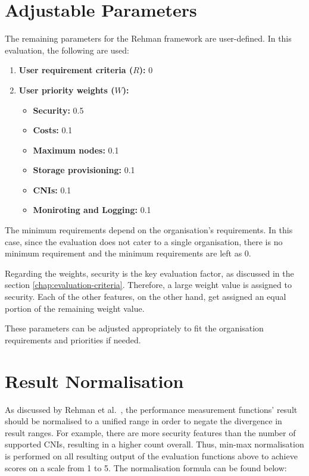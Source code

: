 \section{Adjustable Parameters}\label{adjustable-parameters}

The remaining parameters for the Rehman framework are user-defined. In this evaluation, the following are used:

\begin{enumerate}
\def\labelenumi{\arabic{enumi}.}
\tightlist
\item
  \textbf{User requirement criteria (\(R\)):} 0
\item
  \textbf{User priority weights (\(W\)):}

  \begin{itemize}
  \tightlist
  \item
    \textbf{Security:} 0.5
  \item
    \textbf{Costs:} 0.1
  \item
    \textbf{Maximum nodes:} 0.1
  \item
    \textbf{Storage provisioning:} 0.1
  \item
    \textbf{CNIs:} 0.1
  \item
    \textbf{Moniroting and Logging:} 0.1
  \end{itemize}
\end{enumerate}

The minimum requirements depend on the organisation's requirements.
In this case, since the evaluation does not cater to a single
organisation, there is no minimum requirement and the minimum
requirements are left as 0.

Regarding the weights, security is the key evaluation factor, as
discussed in the section \ref{chap:evaluation-criteria}. Therefore, a large weight value is
assigned to security. Each of the other features, on the other hand, get
assigned an equal portion of the remaining weight value.

These parameters can be adjusted appropriately to fit the organisation
requirements and priorities if needed.

\section{Result Normalisation}\label{result-normalisation}

As discussed by Rehman et al.~\cite{5976164}, the performance
measurement functions' result should be normalised to a unified range in order to negate the divergence in result ranges. For example, there are more security features than the number of supported CNIs, resulting in a higher count overall. Thus,
min-max normalisation is performed on all resulting output of the evaluation functions above to
achieve scores on a scale from 1 to 5. The normalisation formula can be
found below:


